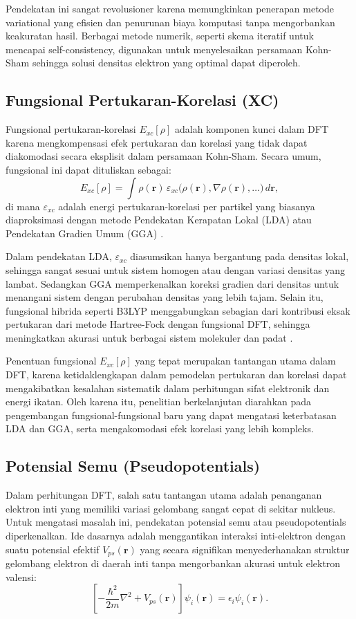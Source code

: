 Pendekatan ini sangat revolusioner karena memungkinkan penerapan metode variational yang efisien dan penurunan biaya komputasi tanpa mengorbankan keakuratan hasil. Berbagai metode numerik, seperti skema iteratif untuk mencapai self-consistency, digunakan untuk menyelesaikan persamaan Kohn-Sham sehingga solusi densitas elektron yang optimal dapat diperoleh.

\subsection{Fungsional Pertukaran-Korelasi (XC)}
Fungsional pertukaran-korelasi \(E_{xc}[\rho]\) adalah komponen kunci dalam DFT karena mengkompensasi efek pertukaran dan korelasi yang tidak dapat diakomodasi secara eksplisit dalam persamaan Kohn-Sham. Secara umum, fungsional ini dapat dituliskan sebagai:
\begin{equation}
    E_{xc}[\rho] = \int \rho(\mathbf{r})\,\varepsilon_{xc}\Big(\rho(\mathbf{r}), \nabla\rho(\mathbf{r}), \ldots\Big) \, d\mathbf{r},
\end{equation}
di mana \(\varepsilon_{xc}\) adalah energi pertukaran-korelasi per partikel yang biasanya diaproksimasi dengan metode Pendekatan Kerapatan Lokal (LDA) atau Pendekatan Gradien Umum (GGA) \citep{Perdew1996}.

Dalam pendekatan LDA, \(\varepsilon_{xc}\) diasumsikan hanya bergantung pada densitas lokal, sehingga sangat sesuai untuk sistem homogen atau dengan variasi densitas yang lambat. Sedangkan GGA memperkenalkan koreksi gradien dari densitas untuk menangani sistem dengan perubahan densitas yang lebih tajam. Selain itu, fungsional hibrida seperti B3LYP menggabungkan sebagian dari kontribusi eksak pertukaran dari metode Hartree-Fock dengan fungsional DFT, sehingga meningkatkan akurasi untuk berbagai sistem molekuler dan padat \citep{Becke1993}.

Penentuan fungsional \(E_{xc}[\rho]\) yang tepat merupakan tantangan utama dalam DFT, karena ketidaklengkapan dalam pemodelan pertukaran dan korelasi dapat mengakibatkan kesalahan sistematik dalam perhitungan sifat elektronik dan energi ikatan. Oleh karena itu, penelitian berkelanjutan diarahkan pada pengembangan fungsional-fungsional baru yang dapat mengatasi keterbatasan LDA dan GGA, serta mengakomodasi efek korelasi yang lebih kompleks.

\subsection{Potensial Semu (Pseudopotentials)}
Dalam perhitungan DFT, salah satu tantangan utama adalah penanganan elektron inti yang memiliki variasi gelombang sangat cepat di sekitar nukleus. Untuk mengatasi masalah ini, pendekatan potensial semu atau pseudopotentials diperkenalkan. Ide dasarnya adalah menggantikan interaksi inti-elektron dengan suatu potensial efektif \(V_{ps}(\mathbf{r})\) yang secara signifikan menyederhanakan struktur gelombang elektron di daerah inti tanpa mengorbankan akurasi untuk elektron valensi:
\begin{equation}
    \left[-\frac{\hbar^2}{2m}\nabla^2 + V_{ps}(\mathbf{r})\right]\psi_i(\mathbf{r}) = \epsilon_i \psi_i(\mathbf{r}).
\end{equation}

